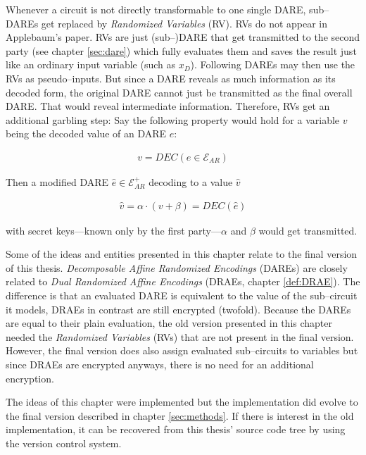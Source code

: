 \label{sec:rv}

Whenever a circuit is not directly transformable to one single DARE, sub--DAREs
get replaced by \emph{Randomized Variables} (RV). RVs do not appear in
Applebaum's paper\cite{gac2012}. RVs are just (sub--)DARE that
get transmitted to the second party (see chapter \ref{sec:dare}) which
fully evaluates them and saves the result just like an ordinary input variable
(such as $x_D$). Following DAREs may then use the RVs as pseudo--inputs. But
since a DARE reveals as much information as its decoded form, the original DARE
cannot just be transmitted as the final overall DARE. That would reveal
intermediate information. Therefore, RVs get an additional garbling step: Say
the following property would hold for a variable $v$ being the decoded value of
an DARE $e$:

\begin{align*}
  v = DEC(e \in \mathcal{E}_{AR})
\end{align*}

\noindent{}Then a modified DARE $\hat{e} \in \mathcal{E}_{AR}^+$ decoding to a
value $\hat{v}$

\begin{align*}
\hat{v} = \alpha \cdot (v + \beta) = DEC(\hat{e})
\end{align*}

\noindent{}with secret keys---known only by the first party---$\alpha$ and
$\beta$ would get transmitted.



Some of the ideas and entities presented in this chapter relate to the final
version of this thesis. \emph{Decomposable Affine Randomized Encodings} (DAREs)
are closely related to \emph{Dual Randomized Affine Encodings} (DRAEs, chapter
\ref{def:DRAE}). The difference is that an evaluated DARE is equivalent to the
value of the sub--circuit it models, DRAEs in contrast are still
encrypted (twofold). Because the DAREs are equal to their plain evaluation,
the old version presented in this chapter needed the \emph{Randomized Variables}
(RVs) that are not present in the final version. However, the final version does
also assign evaluated sub--circuits to variables but since DRAEs are encrypted
anyways, there is no need for an additional encryption.



The ideas of this chapter were implemented but the implementation did
evolve to the final version described in chapter \ref{sec:methods}. If
there is interest in the old implementation, it can be recovered from this
thesis' source code tree by using the \JWTgit{} version control system.

